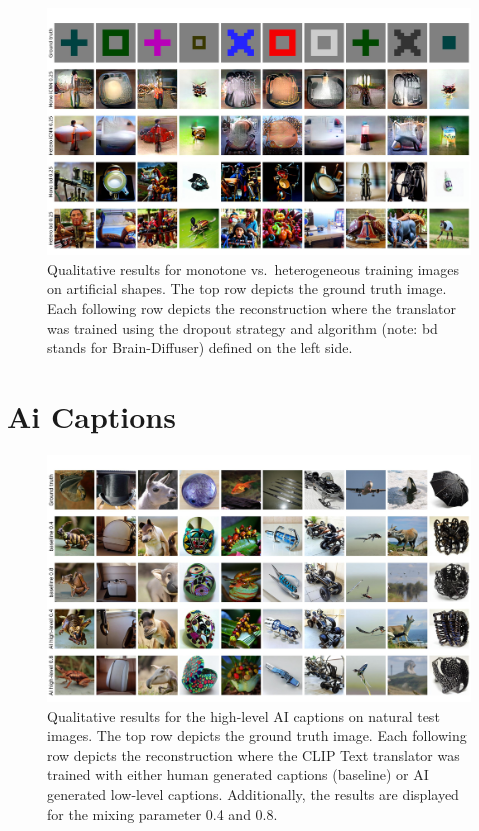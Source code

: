  \begin{figure}[H]
   \centering
   \includegraphics[width=1\textwidth]{plots/dropout_discussion_art.JPEG}
   \caption[Reconstructed images with monotonous and heterogeneous training data on artificial shapes]{Qualitative results for monotone vs.\ heterogeneous training images on artificial shapes. The top row depicts the ground truth image. Each following row depicts the reconstruction where the translator was trained using the dropout strategy and algorithm (note: bd stands for Brain-Diffuser) defined on the left side.}\label{fig:dropout_discussion_art}
 \end{figure}


\section{Ai Captions}

\begin{figure}[H]
   \centering
   \includegraphics[width=1\textwidth]{plots/aicap_qual_test_highlevel_appendix.JPEG}
   \caption[Experiment 2: Reconstructed images for Brain-Diffuser on natural test images with high-level captions]{Qualitative results for the high-level AI captions on natural test images. The top row depicts the ground truth image. Each following row depicts the reconstruction where the CLIP Text translator was trained with either human generated captions (baseline) or AI generated low-level captions. Additionally, the results are displayed for the mixing parameter 0.4 and 0.8.}\label{fig:aicap_qual_test_highlevel_appendix}
\end{figure}

